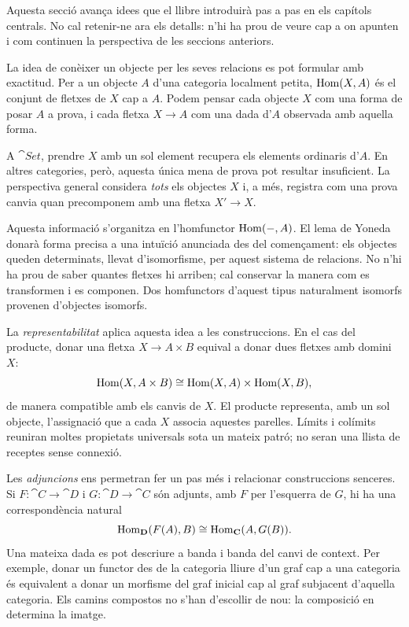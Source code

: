 Aquesta secció avança idees que el llibre introduirà pas a pas en els
capítols centrals. No cal retenir-ne ara els detalls: n'hi ha prou de
veure cap a on apunten i com continuen la perspectiva de les seccions
anteriors.

La idea de conèixer un objecte per les seves relacions es pot formular
amb exactitud. Per a un objecte $A$ d'una categoria localment petita,
$\operatorname{Hom}(X,A)$ és el conjunt de fletxes de $X$ cap a $A$. Podem pensar cada
objecte $X$ com una forma de posar $A$ a prova, i cada fletxa $X\to A$
com una dada d'$A$ observada amb aquella forma.

A $\cat{Set}$, prendre $X$ amb un sol element recupera els elements
ordinaris d'$A$. En altres categories, però, aquesta única mena de prova
pot resultar insuficient. La perspectiva general considera \emph{tots}
els objectes $X$ i, a més, registra com una prova canvia quan precomponem
amb una fletxa $X'\to X$.

Aquesta informació s'organitza en l'homfunctor $\operatorname{Hom}(-,A)$.
El lema de Yoneda donarà forma precisa a una intuïció anunciada des
del començament: els objectes queden determinats, llevat d'isomorfisme,
per aquest sistema de relacions. No n'hi ha prou de saber quantes
fletxes hi arriben; cal conservar la manera com es transformen i es
componen. Dos homfunctors d'aquest tipus naturalment isomorfs provenen
d'objectes isomorfs.

La \emph{representabilitat} aplica aquesta idea a les construccions.
En el cas del producte, donar una fletxa $X\to A\times B$ equival a
donar dues fletxes amb domini $X$:
\[
  \operatorname{Hom}(X,A\times B)
  \cong \operatorname{Hom}(X,A)\times\operatorname{Hom}(X,B),
\]
de manera compatible amb els canvis de $X$. El producte representa,
amb un sol objecte, l'assignació que a cada $X$ associa aquestes parelles.
Límits i colímits reuniran moltes propietats universals sota un mateix
patró; no seran una llista de receptes sense connexió.

Les \emph{adjuncions} ens permetran fer un pas més i relacionar
construccions senceres. Si $F\colon\cat{C}\to\cat{D}$ i
$G\colon\cat{D}\to\cat{C}$ són adjunts, amb $F$ per l'esquerra de
$G$, hi ha una correspondència natural
\[
  \operatorname{Hom}_{\mathbf{D}}(F(A),B)
  \cong \operatorname{Hom}_{\mathbf{C}}(A,G(B)).
\]
Una mateixa dada es pot descriure a banda i banda del canvi de context.
Per exemple, donar un functor des de la categoria lliure d'un graf cap
a una categoria és equivalent a donar un morfisme del graf inicial cap
al graf subjacent d'aquella categoria. Els camins compostos no s'han
d'escollir de nou: la composició en determina la imatge.

